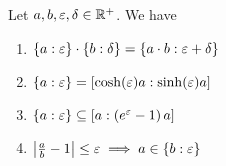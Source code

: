 \begin{theorem} \label{thm:multiplicative:rules}
  Let $a,b,\epsilon,\delta \in\Rplus$. We have

  \begin{enumerate}
    \item $\ean[\epsilon]{a} \cdot \ean[\delta]{b} = \ean[\epsilon+\delta]{a\cdot b}$
    \item $\ean[\epsilon]{a} = \an[\sinh(\epsilon)a]{\cosh(\epsilon)a}$
    \item $\ean[\epsilon]{a} \subseteq \an[\left(e^\epsilon-1\right)a]{a}$
    \item $\abs{\frac ab-1} \le \epsilon \implies a\in\ean[\epsilon]{b}$
  \end{enumerate}
\end{theorem}

